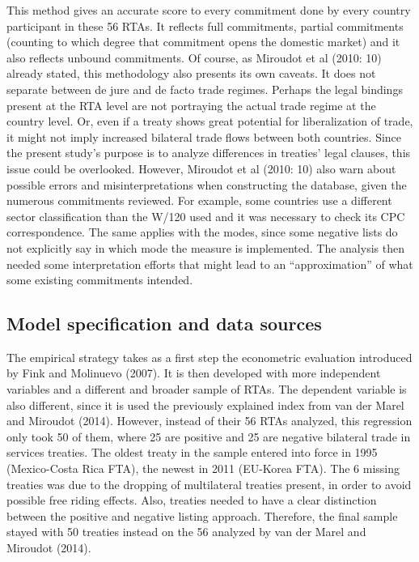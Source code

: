 \documentclass{article}
\begin{document}
\smallskip

This method gives an accurate score to every commitment done by every country participant in these 56 RTAs. It reflects full commitments, partial commitments (counting to which degree that commitment opens the domestic market) and it also reflects unbound commitments. Of course, as Miroudot et al (2010: 10) already stated, this methodology also presents its own caveats. It does not separate between de jure and de facto trade regimes. Perhaps the legal bindings present at the RTA level are not portraying the actual trade regime at the country level. Or, even if a treaty shows great potential for liberalization of trade, it might not imply increased bilateral trade flows between both countries. Since the present study’s purpose is to analyze differences in treaties’ legal clauses, this issue could be overlooked. However, Miroudot et al (2010: 10) also warn about possible errors and misinterpretations when constructing the database, given the numerous commitments reviewed. For example, some countries use a different sector classification than the W/120 used and it was necessary to check its CPC correspondence. The same applies with the modes, since some negative lists do not explicitly say in which mode the measure is implemented. The analysis then needed some interpretation efforts that might lead to an “approximation” of what some existing commitments intended.

\subsection{Model specification and data sources}

The empirical strategy takes as a first step the econometric evaluation introduced by Fink and Molinuevo (2007). It is then developed with more independent variables and a different and broader sample of RTAs. The dependent variable is also different, since it is used the previously explained index from van der Marel and Miroudot (2014). However, instead of their 56 RTAs analyzed, this regression only took 50 of them, where 25 are positive and 25 are negative bilateral trade in services treaties. The oldest treaty in the sample entered into force in 1995 (Mexico-Costa Rica FTA), the newest in 2011 (EU-Korea FTA). The 6 missing treaties was due to the dropping of multilateral treaties present, in order to avoid possible free riding effects. Also, treaties needed to have a clear distinction between the positive and negative listing approach. Therefore, the final sample stayed with 50 treaties instead on the 56 analyzed by van der Marel and Miroudot (2014).
\end{document}
